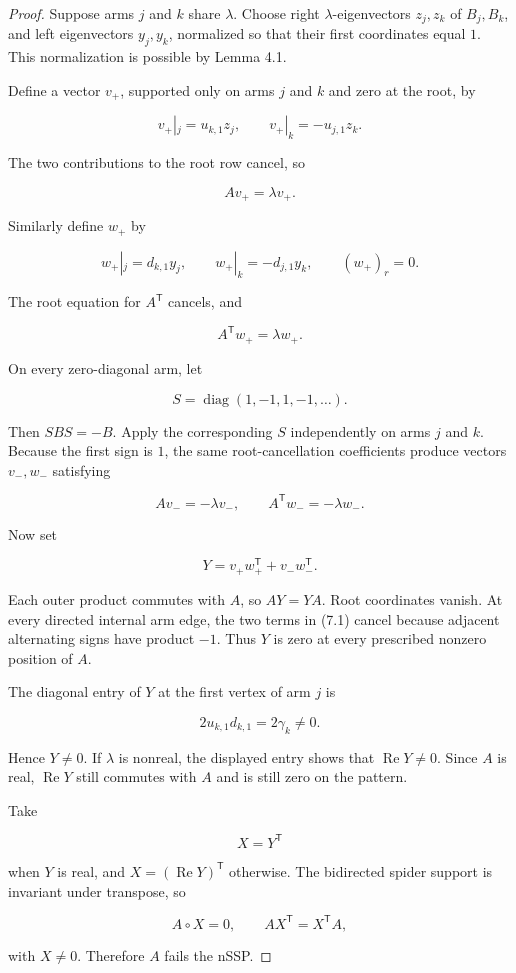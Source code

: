 \documentclass[11pt]{article}
\theoremstyle{remark}
\begin{document}
\begin{proof}

Suppose arms $j$ and $k$ share $\lambda$. Choose right $\lambda$-eigenvectors $z_j,z_k$ of $B_j,B_k$, and left eigenvectors $y_j,y_k$, normalized so that their first coordinates equal $1$. This normalization is possible by Lemma 4.1.

Define a vector $v_+$, supported only on arms $j$ and $k$ and zero at the root, by

\[
v_+|_j=u_{k,1}z_j,
\qquad
v_+|_k=-u_{j,1}z_k.
\]

The two contributions to the root row cancel, so

\[
Av_+=\lambda v_+.
\]

Similarly define $w_+$ by

\[
w_+|_j=d_{k,1}y_j,
\qquad
w_+|_k=-d_{j,1}y_k,
\qquad
(w_+)_r=0.
\]

The root equation for $A^{\mathsf T}$ cancels, and

\[
A^{\mathsf T}w_+=\lambda w_+.
\]

On every zero-diagonal arm, let

\[
S=\operatorname{diag}(1,-1,1,-1,\ldots).
\]

Then $SBS=-B$. Apply the corresponding $S$ independently on arms $j$ and $k$. Because the first sign is $1$, the same root-cancellation coefficients produce vectors $v_-,w_-$ satisfying

\[
Av_-=-\lambda v_-,
\qquad
A^{\mathsf T}w_-=-\lambda w_-.
\]

Now set

\[
Y=v_+w_+^{\mathsf T}+v_-w_-^{\mathsf T}.
\tag{7.1}
\]

Each outer product commutes with $A$, so $AY=YA$. Root coordinates vanish. At every directed internal arm edge, the two terms in (7.1) cancel because adjacent alternating signs have product $-1$. Thus $Y$ is zero at every prescribed nonzero position of $A$.

The diagonal entry of $Y$ at the first vertex of arm $j$ is

\[
2u_{k,1}d_{k,1}=2\gamma_k\ne0.
\]

Hence $Y\ne0$. If $\lambda$ is nonreal, the displayed entry shows that $\operatorname{Re}Y\ne0$. Since $A$ is real, $\operatorname{Re}Y$ still commutes with $A$ and is still zero on the pattern.

Take

\[
X=Y^{\mathsf T}
\]

when $Y$ is real, and $X=(\operatorname{Re}Y)^{\mathsf T}$ otherwise. The bidirected spider support is invariant under transpose, so

\[
A\circ X=0,
\qquad
AX^{\mathsf T}=X^{\mathsf T}A,
\]

with $X\ne0$. Therefore $A$ fails the nSSP.
\end{proof}
\end{document}
